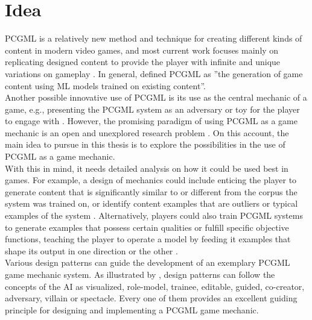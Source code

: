 \documentclass[MGS,Master,english]{twbook}%
\begin{document}
\section{Idea}
\ac{PCGML} is a relatively new method and technique for creating different kinds of content in modern video games, and most current work focuses mainly on replicating designed content to provide the player with infinite and unique variations on gameplay \cite{pcgml::paper}. In general, \citep{pcgml::paper} defined PCGML as ''the generation of game content using ML models trained on existing content''. \\
Another possible innovative use of PCGML is its use as the central mechanic of a game, e.g., presenting the PCGML system as an adversary or toy for the player to engage with  \cite{pcgml::paper}. However, the promising paradigm of using PCGML as a game mechanic is an open and unexplored research problem \cite{pcgml::paper}. On this account, the main idea to pursue in this thesis is to explore the possibilities in the use of PCGML as a game mechanic. \\
With this in mind, it needs detailed analysis on how it could be used best in games. For example, a design of mechanics could include enticing the player to generate content that is significantly similar to or different from the corpus the system was trained on, or identify content examples that are outliers or typical examples of the system \cite{pcgml::paper}. Alternatively, players could also train \ac{PCGML} systems to generate examples that possess certain qualities or fulfill specific objective functions, teaching the player to operate a model by feeding it examples that shape its output in one direction or the other \cite{pcgml::paper}. \\ 
Various design patterns can guide the development of an exemplary PCGML game mechanic system. As illustrated by \citep{ai::aiBasedGameDesignPattern}, design patterns can follow the concepts of the \ac{AI} as visualized, role-model, trainee, editable, guided, co-creator, adversary, villain or spectacle. Every one of them provides an excellent guiding principle for designing and implementing a PCGML game mechanic.
\end{document}
